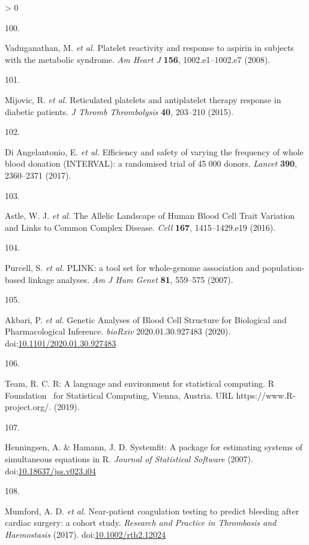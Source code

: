 \documentclass[11pt,twoside]{bristolthesis}
\newlength{\cslhangindent}
\newlength{\csllabelwidth}
\newenvironment{CSLReferences}[2] %
 {%
  \setlength{\parindent}{0pt}
  \ifodd #1 \everypar{\setlength{\hangindent}{\cslhangindent}}\ignorespaces\fi
  \ifnum #2 > 0
  \setlength{\parskip}{#2\baselineskip}
  \fi
 }%
 {}
\newcommand{\CSLLeftMargin}[1]{\parbox[t]{\csllabelwidth}{#1}}
\newcommand{\CSLRightInline}[1]{\parbox[t]{\linewidth - \csllabelwidth}{#1}\break}
\begin{document}
\begin{CSLReferences}{0}{0}
\leavevmode\hypertarget{ref-Vaduganathan2008a}{}%
\CSLLeftMargin{100. }
\CSLRightInline{Vaduganathan, M. \emph{et al.} {Platelet reactivity and response to aspirin in subjects with the metabolic syndrome}. \emph{Am Heart J} \textbf{156}, 1002.e1--1002.e7 (2008).}

\leavevmode\hypertarget{ref-Mijovic2015a}{}%
\CSLLeftMargin{101. }
\CSLRightInline{Mijovic, R. \emph{et al.} {Reticulated platelets and antiplatelet therapy response in diabetic patients}. \emph{J Thromb Thrombolysis} \textbf{40}, 203--210 (2015).}

\leavevmode\hypertarget{ref-DiAngelantonio2017}{}%
\CSLLeftMargin{102. }
\CSLRightInline{Di Angelantonio, E. \emph{et al.} {Efficiency and safety of varying the frequency of whole blood donation (INTERVAL): a randomised trial of 45 000 donors}. \emph{Lancet} \textbf{390}, 2360--2371 (2017).}

\leavevmode\hypertarget{ref-Astle2016}{}%
\CSLLeftMargin{103. }
\CSLRightInline{Astle, W. J. \emph{et al.} {The Allelic Landscape of Human Blood Cell Trait Variation and Links to Common Complex Disease}. \emph{Cell} \textbf{167}, 1415--1429.e19 (2016).}

\leavevmode\hypertarget{ref-Purcell2007a}{}%
\CSLLeftMargin{104. }
\CSLRightInline{Purcell, S. \emph{et al.} {PLINK: a tool set for whole-genome association and population-based linkage analyses}. \emph{Am J Hum Genet} \textbf{81}, 559--575 (2007).}

\leavevmode\hypertarget{ref-Akbari2020}{}%
\CSLLeftMargin{105. }
\CSLRightInline{Akbari, P. \emph{et al.} {Genetic Analyses of Blood Cell Structure for Biological and Pharmacological Inference}. \emph{bioRxiv} 2020.01.30.927483 (2020). doi:\href{https://doi.org/10.1101/2020.01.30.927483}{10.1101/2020.01.30.927483}}

\leavevmode\hypertarget{ref-Team2019a}{}%
\CSLLeftMargin{106. }
\CSLRightInline{Team, R. C. {R: A language and environment for statistical computing. R Foundation~ for Statistical Computing, Vienna, Austria. URL https://www.R-project.org/.} (2019).}

\leavevmode\hypertarget{ref-Henningsen2007}{}%
\CSLLeftMargin{107. }
\CSLRightInline{Henningsen, A. \& Hamann, J. D. {Systemfit: A package for estimating systems of simultaneous equations in R}. \emph{Journal of Statistical Software} (2007). doi:\href{https://doi.org/10.18637/jss.v023.i04}{10.18637/jss.v023.i04}}

\leavevmode\hypertarget{ref-Mumford2017}{}%
\CSLLeftMargin{108. }
\CSLRightInline{Mumford, A. D. \emph{et al.} {Near-patient coagulation testing to predict bleeding after cardiac surgery: a cohort study}. \emph{Research and Practice in Thrombosis and Haemostasis} (2017). doi:\href{https://doi.org/10.1002/rth2.12024}{10.1002/rth2.12024}}


\end{CSLReferences}
\end{document}
